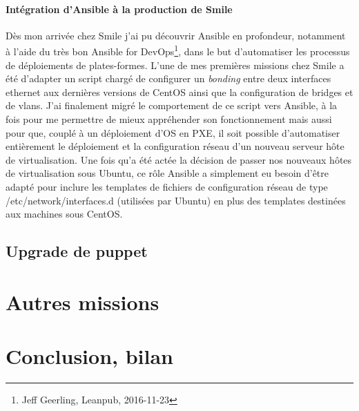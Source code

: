\documentclass[14 pt]{extreport}
\begin{document}
\subsubsection{Intégration d'Ansible à la production de Smile}

Dès mon arrivée chez Smile j'ai pu découvrir Ansible en profondeur, notamment à l'aide du très bon Ansible for DevOps\footnote{Jeff Geerling, Leanpub, 2016-11-23}, dans le but d'automatiser les processus de déploiements de plates-formes. L'une de mes premières missions chez Smile a été d'adapter un script chargé de configurer un \emph{bonding} entre deux interfaces ethernet aux dernières versions de CentOS ainsi que la configuration de bridges et de vlans. J'ai finalement migré le comportement de ce script vers Ansible, à la fois pour me permettre de mieux appréhender son fonctionnement mais aussi pour que, couplé à un déploiement d'OS en PXE, il soit possible d'automatiser entièrement le déploiement et la configuration réseau d'un nouveau serveur hôte de virtualisation. Une fois qu'a été actée la décision de passer nos nouveaux hôtes de virtualisation sous Ubuntu, ce rôle Ansible a simplement eu besoin d'être adapté pour inclure les templates de fichiers de configuration réseau de type /etc/network/interfaces.d (utilisées par Ubuntu) en plus des templates destinées aux machines sous CentOS.



\lipsum[1]
\lipsum[1]
\lipsum[1]
\lipsum[1]

\section{Upgrade de puppet}
\lipsum[1]
\lipsum[1]
\lipsum[1]
\lipsum[1]


\chapter{Autres missions}
\lipsum

\chapter{Conclusion, bilan}
\lipsum
\end{document}
